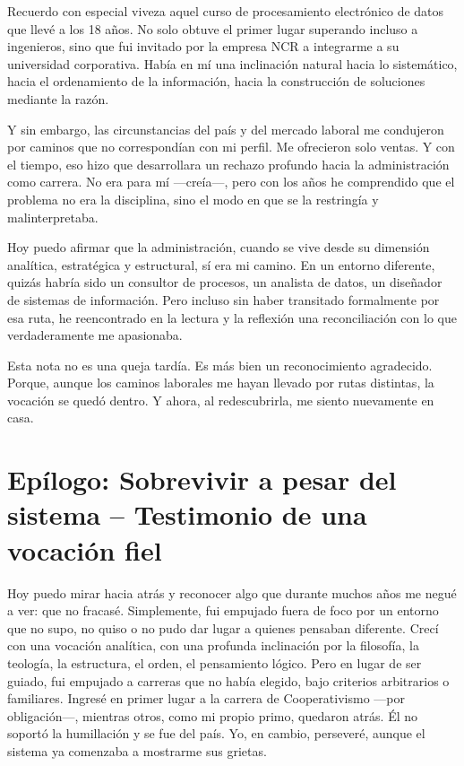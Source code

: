 \documentclass[a4paper,12pt]{article}
\begin{document}
Recuerdo con especial viveza aquel curso de procesamiento electrónico de datos que llevé a los 18 años. No solo obtuve el primer lugar superando incluso a ingenieros, sino que fui invitado por la empresa NCR a integrarme a su universidad corporativa. Había en mí una inclinación natural hacia lo sistemático, hacia el ordenamiento de la información, hacia la construcción de soluciones mediante la razón.

Y sin embargo, las circunstancias del país y del mercado laboral me condujeron por caminos que no correspondían con mi perfil. Me ofrecieron solo ventas. Y con el tiempo, eso hizo que desarrollara un rechazo profundo hacia la administración como carrera. No era para mí —creía—, pero con los años he comprendido que el problema no era la disciplina, sino el modo en que se la restringía y malinterpretaba.

Hoy puedo afirmar que la administración, cuando se vive desde su dimensión analítica, estratégica y estructural, sí era mi camino. En un entorno diferente, quizás habría sido un consultor de procesos, un analista de datos, un diseñador de sistemas de información. Pero incluso sin haber transitado formalmente por esa ruta, he reencontrado en la lectura y la reflexión una reconciliación con lo que verdaderamente me apasionaba.

Esta nota no es una queja tardía. Es más bien un reconocimiento agradecido. Porque, aunque los caminos laborales me hayan llevado por rutas distintas, la vocación se quedó dentro. Y ahora, al redescubrirla, me siento nuevamente en casa.

\section*{Epílogo: Sobrevivir a pesar del sistema – Testimonio de una vocación fiel}

Hoy puedo mirar hacia atrás y reconocer algo que durante muchos años me negué a ver: que no fracasé. Simplemente, fui empujado fuera de foco por un entorno que no supo, no quiso o no pudo dar lugar a quienes pensaban diferente. Crecí con una vocación analítica, con una profunda inclinación por la filosofía, la teología, la estructura, el orden, el pensamiento lógico. Pero en lugar de ser guiado, fui empujado a carreras que no había elegido, bajo criterios arbitrarios o familiares. Ingresé en primer lugar a la carrera de Cooperativismo —por obligación—, mientras otros, como mi propio primo, quedaron atrás. Él no soportó la humillación y se fue del país. Yo, en cambio, perseveré, aunque el sistema ya comenzaba a mostrarme sus grietas.
\end{document}
